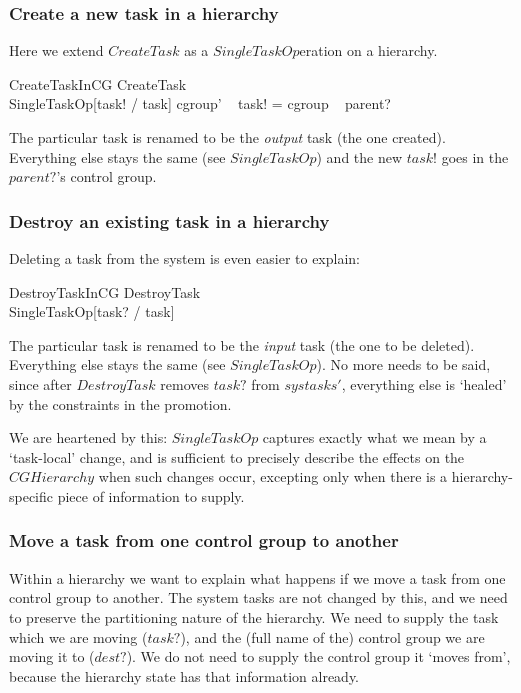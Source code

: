 \documentclass[a4paper,twoside,12pt]{article}
\begin{document}
\subsubsection{Create a new task in a hierarchy}

Here we extend $CreateTask$ as a $SingleTaskOp$eration on a hierarchy.

\begin{schema}{CreateTaskInCG}
CreateTask \\
SingleTaskOp[task! / task]
\where
cgroup' ~ task! = cgroup ~ parent?
\end{schema}
The particular task is renamed to be the \emph{output} task (the one created).
Everything else stays the same (see $SingleTaskOp$) and the new $task!$ goes in the $parent?$'s control group.

\subsubsection{Destroy an existing task in a hierarchy}

Deleting a task from the system is even easier to explain:

\begin{schema}{DestroyTaskInCG}
DestroyTask \\
SingleTaskOp[task? / task]
\end{schema}
The particular task is renamed to be the \emph{input} task (the one to be deleted).
Everything else stays the same (see $SingleTaskOp$).
No more needs to be said, since after $DestroyTask$ removes $task?$ from $systasks'$,
everything else is `healed' by the constraints in the promotion.

We are heartened by this: $SingleTaskOp$ captures exactly what we mean by a `task-local' change,
and is sufficient to precisely describe the effects on the $CGHierarchy$ when such changes occur, excepting only
when there is
a hierarchy-specific piece of information to supply.

\subsubsection{Move a task from one control group to another}

Within a hierarchy we want to explain what happens if we move a task from one control group to another.
The system tasks are not changed by this, and we need to preserve the partitioning nature of the hierarchy.
We need to supply the task which we are moving ($task?$),
and the (full name of the) control group we are moving it to ($dest?$).
We do not need to supply the control group it `moves from', because the hierarchy state has that information already.
\end{document}

